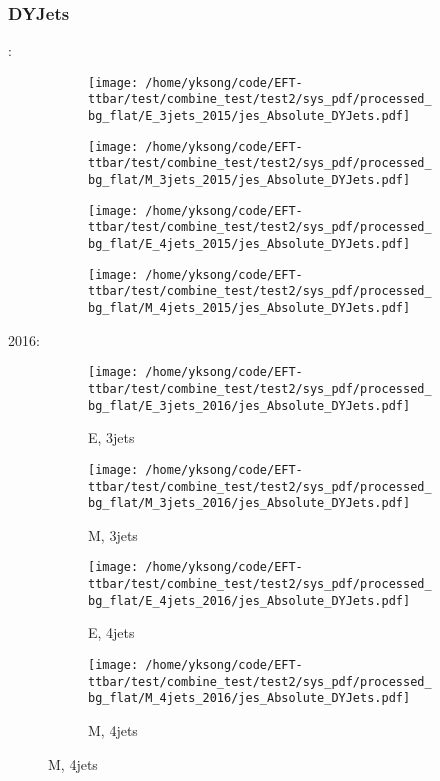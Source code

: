 \documentclass{beamer}
\begin{document}
\begin{frame}
\frametitle{DYJets}
\fontsize{5}{1}:
\begin{figure}
\centering
\begin{subfigure}[b]{0.24\textwidth}
\texttt{[image: /home/yksong/code/EFT-ttbar/test/combine\_test/test2/sys\_pdf/processed\_bg\_flat/E\_3jets\_2015/jes\_Absolute\_DYJets.pdf]}
\end{subfigure}
\begin{subfigure}[b]{0.24\textwidth}
\texttt{[image: /home/yksong/code/EFT-ttbar/test/combine\_test/test2/sys\_pdf/processed\_bg\_flat/M\_3jets\_2015/jes\_Absolute\_DYJets.pdf]}
\end{subfigure}
\begin{subfigure}[b]{0.24\textwidth}
\texttt{[image: /home/yksong/code/EFT-ttbar/test/combine\_test/test2/sys\_pdf/processed\_bg\_flat/E\_4jets\_2015/jes\_Absolute\_DYJets.pdf]}
\end{subfigure}
\begin{subfigure}[b]{0.24\textwidth}
\texttt{[image: /home/yksong/code/EFT-ttbar/test/combine\_test/test2/sys\_pdf/processed\_bg\_flat/M\_4jets\_2015/jes\_Absolute\_DYJets.pdf]}
\end{subfigure}
\end{figure}
2016:
\begin{figure}
\centering
\begin{subfigure}[b]{0.24\textwidth}
\texttt{[image: /home/yksong/code/EFT-ttbar/test/combine\_test/test2/sys\_pdf/processed\_bg\_flat/E\_3jets\_2016/jes\_Absolute\_DYJets.pdf]}
\captionsetup{font=tiny}
\caption{E, 3jets}
\end{subfigure}
\begin{subfigure}[b]{0.24\textwidth}
\texttt{[image: /home/yksong/code/EFT-ttbar/test/combine\_test/test2/sys\_pdf/processed\_bg\_flat/M\_3jets\_2016/jes\_Absolute\_DYJets.pdf]}
\captionsetup{font=tiny}
\caption{M, 3jets}
\end{subfigure}
\begin{subfigure}[b]{0.24\textwidth}
\texttt{[image: /home/yksong/code/EFT-ttbar/test/combine\_test/test2/sys\_pdf/processed\_bg\_flat/E\_4jets\_2016/jes\_Absolute\_DYJets.pdf]}
\captionsetup{font=tiny}
\caption{E, 4jets}
\end{subfigure}
\begin{subfigure}[b]{0.24\textwidth}
\texttt{[image: /home/yksong/code/EFT-ttbar/test/combine\_test/test2/sys\_pdf/processed\_bg\_flat/M\_4jets\_2016/jes\_Absolute\_DYJets.pdf]}
\captionsetup{font=tiny}
\caption{M, 4jets}
\end{subfigure}
\end{figure}
\end{frame}
\end{document}
